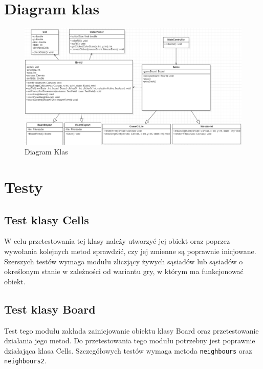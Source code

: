 \documentclass[10pt, oneside]{article}
\begin{document}
\section{Diagram klas}

\begin{figure}[H]
	\centering
	\includegraphics[width=13cm]{DiagramKlas.png}
	\caption{Diagram Klas}
\end{figure}

\section{Testy}
\subsection{Test klasy Cells}
W celu przetestowania tej klasy należy utworzyć jej obiekt oraz poprzez wywołania kolejnych metod sprawdzić, czy jej zmienne są poprawnie inicjowane. Szerszych testów wymaga modułu zliczjący żywych sąsiadów lub sąsiadów o określonym stanie w zależności od wariantu gry, w którym ma funkcjonować obiekt.
\subsection{Test klasy Board}
Test tego modułu zakłada zainicjowanie obiektu klasy Board oraz przetestowanie działania jego metod. Do przetestowania tego modułu potrzebny jest poprawnie działająca klasa Cells. Szczegółowych testów wymaga metoda \texttt{neighbours} oraz \texttt{neighbours2}.
\end{document}
